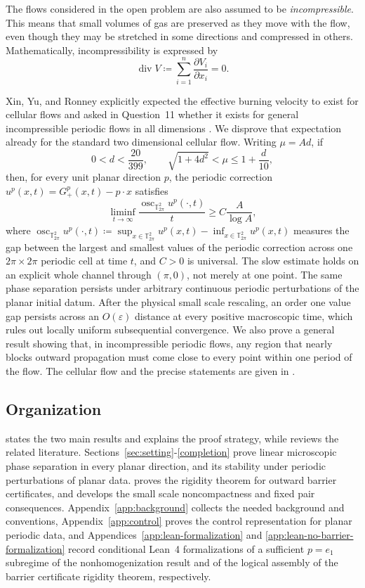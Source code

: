 \documentclass[11pt,reqno,noamsfonts]{amsart}
\theoremstyle{definition}
\theoremstyle{remark}
\newcommand{\T}{\mathbb T}
\newcommand{\osc}{\operatorname{osc}}
\begin{document}
The flows considered in the open problem are also assumed to be
\emph{incompressible}. This means that small volumes of gas are
preserved as they move with the flow, even though they may be stretched
in some directions and compressed in others. Mathematically,
incompressibility is expressed by
\[
  \operatorname{div}V
  \coloneqq 
  \sum_{i=1}^n
  \frac{\partial V_i}{\partial x_i}
  =0.
\]

Xin, Yu, and Ronney explicitly expected the effective burning velocity
to exist for cellular flows and asked in Question~11 whether it exists
for general incompressible periodic flows in all dimensions
\cite[Section~5.2, Question~11]{XinYuRonney2024}.  We disprove that
expectation already for the standard two dimensional cellular flow.
Writing $\mu=Ad$, if
\[
  0<d<\frac{20}{399},
  \qquad
  \sqrt{1+4d^2}<\mu\le1+\frac d{10},
\]
then, for every unit planar direction $p$, the periodic correction
$u^p(x,t)=G_+^p(x,t)-p\cdot x$ satisfies
\[
  \liminf_{t\to\infty}
  \frac{\osc_{\T^2_{2\pi}}u^p(\cdot,t)}{t}
  \ge C\frac A{\log A},
\]
where $\osc_{\T^2_{2\pi}} u^p(\cdot,t)
\coloneqq 
\sup_{x\in\T^2_{2\pi}} u^p(x,t) - \inf_{x\in\T^2_{2\pi}} u^p(x,t)$ measures the gap between the largest and smallest values of the periodic correction across one $2\pi\times 2\pi$ periodic cell at time $t$, and $C>0$ is universal.  The slow estimate holds on an explicit whole
channel through $(\pi,0)$, not merely at one point.  The same phase
separation persists under arbitrary continuous periodic perturbations
of the planar initial datum.  After the physical small scale rescaling,
an order one value gap persists across an $O(\varepsilon)$ distance at
every positive macroscopic time, which rules out locally uniform
subsequential convergence.  We also prove a general result showing that, in incompressible periodic
flows, any region that nearly blocks outward propagation must come close
to every point within one period of the flow. The cellular
flow and the precise statements are given in .


\subsection{Organization}

 states the two main results and explains the proof
strategy, while  reviews the related literature.
Sections~\ref{sec:setting}-\ref{completion} prove linear microscopic
phase separation in every planar direction, and its stability under
periodic perturbations of planar data.   proves the
rigidity theorem for outward barrier certificates, and
 develops the small scale noncompactness and
fixed pair consequences.  Appendix~\ref{app:background} collects the needed 
background and conventions, Appendix~\ref{app:control} proves the
control representation for planar periodic data, and
Appendices~\ref{app:lean-formalization} and
\ref{app:lean-no-barrier-formalization} record conditional Lean~4
formalizations of a sufficient $p=e_1$ subregime of the nonhomogenization result
and of the logical assembly of the barrier certificate rigidity theorem,
respectively.
\end{document}
